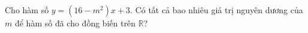 \begin{ex}
Cho hàm số $y=(16-m^2)x+3$. Có tất cả bao nhiêu giá trị nguyên dương của $m$ để hàm số đã cho đồng biến trên $\mathbb R$?
\end{ex}
